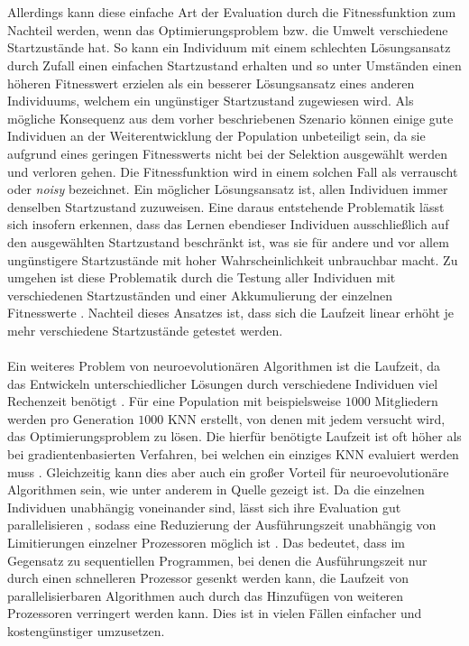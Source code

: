 \\\\
Allerdings kann diese einfache Art der Evaluation durch die Fitnessfunktion zum Nachteil werden, wenn das Optimierungsproblem bzw. die Umwelt verschiedene Startzustände hat. So kann ein Individuum mit einem schlechten Lösungsansatz durch Zufall einen einfachen Startzustand erhalten und so unter Umständen einen höheren Fitnesswert erzielen als ein besserer Lösungsansatz eines anderen Individuums, welchem ein ungünstiger Startzustand zugewiesen wird. Als mögliche Konsequenz aus dem vorher beschriebenen Szenario können einige gute Individuen an der Weiterentwicklung der Population unbeteiligt sein, da sie aufgrund eines geringen Fitnesswerts nicht bei der Selektion ausgewählt werden und verloren gehen. Die Fitnessfunktion wird in einem solchen Fall als verrauscht oder \emph{noisy} bezeichnet. Ein möglicher Lösungsansatz ist, allen Individuen immer denselben Startzustand zuzuweisen. Eine daraus entstehende Problematik lässt sich insofern erkennen, dass das Lernen ebendieser Individuen ausschließlich auf den ausgewählten Startzustand beschränkt ist, was sie für andere und vor allem ungünstigere Startzustände mit hoher Wahrscheinlichkeit unbrauchbar macht. Zu umgehen ist diese Problematik durch die Testung aller Individuen mit verschiedenen Startzuständen und einer 
Akkumulierung der einzelnen Fitnesswerte \cite{whitley1993genetic}. Nachteil dieses Ansatzes ist, dass sich die Laufzeit linear erhöht je mehr verschiedene Startzustände getestet werden.
\\\\
Ein weiteres Problem von neuroevolutionären Algorithmen ist die Laufzeit, da das Entwickeln unterschiedlicher Lösungen durch verschiedene Individuen viel Rechenzeit benötigt \cite{rojas1996neural}. Für eine Population mit beispielsweise $1000$ Mitgliedern werden pro Generation $1000$ \ac{KNN} erstellt, von denen mit jedem versucht wird, das Optimierungsproblem zu lösen. Die hierfür benötigte Laufzeit ist oft höher als bei gradientenbasierten Verfahren, bei welchen ein einziges \ac{KNN} evaluiert werden muss \cite{whitley1993genetic}. Gleichzeitig kann dies aber auch ein großer Vorteil für neuroevolutionäre Algorithmen sein, wie unter anderem in Quelle \cite{such2017deep} gezeigt ist. Da die einzelnen Individuen unabhängig voneinander sind, lässt sich ihre Evaluation gut parallelisieren \cite{rojas1996neural}, sodass eine Reduzierung der Ausführungszeit unabhängig von Limitierungen einzelner Prozessoren möglich ist \cite{schleuter1991explicit}. Das bedeutet, dass im Gegensatz zu sequentiellen Programmen, bei denen die Ausführungszeit nur durch einen schnelleren Prozessor gesenkt werden kann, die Laufzeit von parallelisierbaren Algorithmen auch durch das Hinzufügen von weiteren Prozessoren verringert werden kann. Dies ist in vielen Fällen einfacher und kostengünstiger umzusetzen.

